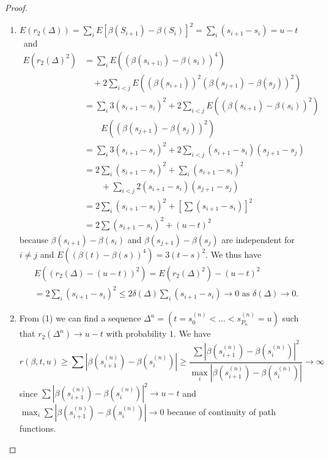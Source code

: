 \begin{proof}
\begin{enumerate}
\renewcommand{\labelenumi}{(\theenumi)}
\item $E (r_2 (\Delta))  = \sum\limits_i E[\beta(S_{i+1}) - \beta(S_i)]^2 =
      \sum\limits_i(s_{i+1} - s_i) 
      = u - t$ \ and 
\begin{align*}
E(r_2 (\Delta)^2)& = \sum\limits_i E((\beta (s_{i+1)}) -\beta
(s_i))^4)\\
&\quad + 2 \sum\limits_{i < j} E((\beta(s_{i+1}))^2 (\beta(s_{j+1}) -
      \beta(s_j))^2)\\
      & = \sum\limits_i 3(s_{i+1} - s_i)^2 + 2 \sum\limits_{i < j}
      E((\beta (s_{i+1}) -\beta (s_i))^2)\\
&\qquad  E(( \beta (s_{j+1})- \beta
      (s_j))^2)\\ 
      & = \sum\limits_i 3(s_{i+1} - s_i)^2 + 2 \sum\limits_{i < j}
      (s_{i+1} - s_i) (s_{j+1} - s_j)\\ 
      & = 2 \sum_i (s_{i+1} - s_i)^2 +
      \sum_i (s_{i+1}-s_i)^2\\
&\qquad + \sum_{i < j} 2 (s_{i+1} - s_i) (s_{j+1}
      - s_j)\\ 
      &= 2 \sum_i (s_{i+1}-s_i)^2 + \left[\sum
        (s_{i+1}-s_i)\right]^2\\
 & = 2 \sum
      (s_{i+1} - s_i)^2 + (u-t)^2 
    \end{align*}
because $\beta(s_{i+1}) - \beta(s_i)$ and $\beta (s_{j+1}) -
    \beta(s_j)$ are independent for $i \neq j$ and $E (( \beta (t) -
    \beta (s))^4) = 3(t - s)^2$. We thus have  
    \begin{multline*}
      E((r_2 (\Delta ) - (u - t))^2) = E (r_2 (\Delta )^2) - (u -
      t)^2\\ 
      = 2 \sum_i (s_{i+1} - s_i)^2 \leq 2 \delta (\Delta) \sum_i (s_{i+1}
      - s_i) \to 0 \text{ as } \delta (\Delta ) \to 0. 
    \end{multline*}
 
\item From (1) we can find a sequence $\Delta^n = (t = s^{(n)}_0 <
    \ldots < s^{(n)}_{P_{n}} = u)$ such that $r_2 (\Delta^n ) \to u -
    t$ with probability $1$. We have  
    $$
    r(\beta, t, u) \geq \sum | \beta(s^{(n)}_{i+1}) -
    \beta(s^{(n)}_i)| \geq \frac{\sum |\beta(s^{(n)}_{i+1}) -
      \beta(s^{(n)}_i)|^2}{\max_i |\beta (s^{(n)}_{i+1}) - \beta
      (s^{(n)}_i)|} \to \infty 
    $$\pageoriginale
    since $\sum|\beta(s^{(n)}_{i+1}) - \beta(s^{(n)}_i)|^2 \to u-t$ and
    $\max_i\sum|\beta(s^{(n)}_{i+1}) - \beta(s^{(n)}_i)| \to 0$
    because of continuity of path functions. 
\end{enumerate}
\end{proof}

